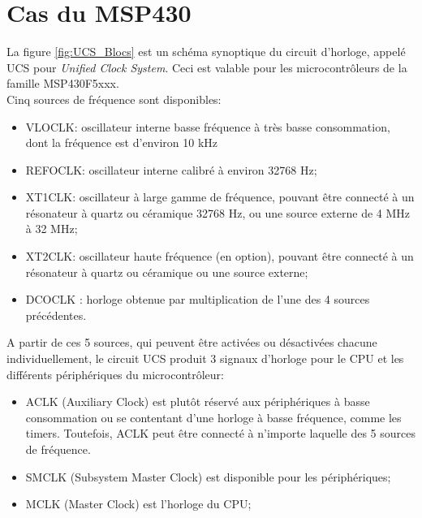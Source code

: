 \pagebreak
\section{Cas du MSP430} 
La figure \ref{fig:UCS_Blocs} est un schéma synoptique du circuit d'horloge, appelé UCS pour \textit{Unified Clock System}. Ceci est valable pour les microcontrôleurs de la famille MSP430F5xxx.\\
Cinq sources de fréquence sont disponibles:
\begin{itemize}[label=\textbullet,font=\small]
\item VLOCLK: oscillateur interne basse fréquence à très basse consommation, dont la fréquence est d'environ 10 kHz
\item REFOCLK: oscillateur interne calibré à environ 32768 Hz;
\item XT1CLK: oscillateur à large gamme de fréquence, pouvant être connecté à un résonateur à quartz ou céramique 32768 Hz, ou une source externe de 4 MHz à 32 MHz;
\item XT2CLK: oscillateur haute fréquence (en option), pouvant être connecté à un résonateur à quartz ou céramique ou une source externe;
\item DCOCLK : horloge obtenue par multiplication de l'une des 4 sources précédentes.
\end{itemize}

\bigskip 
A partir de ces 5 sources, qui peuvent être activées ou désactivées chacune individuellement, le circuit UCS produit 3 signaux d'horloge pour le CPU et les différents périphériques du microcontrôleur:
\begin{itemize}[label=\textbullet,font=\small]
\item ACLK (Auxiliary Clock) est plutôt réservé aux périphériques à basse consommation ou se contentant d'une horloge à basse fréquence, comme les timers. Toutefois, ACLK peut être connecté à n'importe laquelle des 5 sources de fréquence.
\item SMCLK (Subsystem Master Clock) est disponible pour les périphériques;
\item MCLK (Master Clock) est l'horloge du CPU;
\end{itemize}

